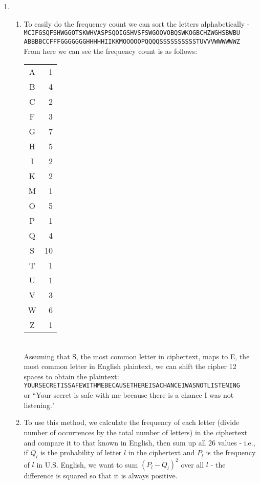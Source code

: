 \documentclass[12pt,letterpaper]{article}
\begin{document}
\begin{enumerate}
    \item
    \begin{enumerate}
        \item
            To easily do the frequency count we can sort the letters alphabetically - \\
            {\tt MCIFGSQFSHWGGOTSKWHVASPSQOIGSHVSFSWGOQVOBQSWKOGBCHZWGHSBWBU}\\
            {\tt ABBBBCCFFFGGGGGGGHHHHHIIKKMOOOOOPQQQQSSSSSSSSSSTUVVVWWWWWWZ}\\
            From here we can see the frequency count is as follows:\\
            \begin{tabular}{cr}
                A &  1 \\
                B &  4 \\
                C &  2 \\
                F &  3 \\
                G &  7 \\
                H &  5 \\
                I &  2 \\
                K &  2 \\
                M &  1 \\
                O &  5 \\
                P &  1 \\
                Q &  4 \\
                S & 10 \\
                T &  1 \\
                U &  1 \\
                V &  3 \\
                W &  6 \\
                Z &  1 \\
            \end{tabular}\\
            Assuming that S, the most common letter in ciphertext, maps to E, the most common letter in English plaintext, we can shift the cipher 12 spaces to obtain the plaintext:\\
            {\tt YOURSECRETISSAFEWITHMEBECAUSETHEREISACHANCEIWASNOTLISTENING}\\
            or ``Your secret is safe with me because there is a chance I was not listening."
        \item
            To use this method, we calculate the frequency of each letter (divide number of occurrences by the total number of letters) in the ciphertext and compare it to that known in English, then sum up all 26 values - i.e., if $Q_l$ is the probability of letter $l$ in the ciphertext and $P_l$ is the frequency of $l$ in U.S. English, we want to sum $(P_l - Q_l)^2$ over all $l$ - the difference is squared so that it is always positive.

\end{enumerate}
\end{enumerate}
\end{document}
